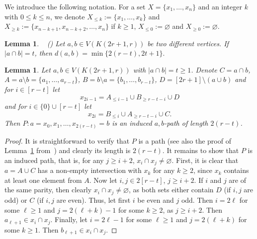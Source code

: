 \documentclass[a4paper,11pt]{article}
\newtheorem{lemma}[theorem]{Lemma}
\renewcommand{\emptyset}{\varnothing}
\begin{document}
We introduce the following notation.
For a set $X=\{x_1,\ldots , x_n\}$ and an integer $k$ with $0\leq k\leq n$, we denote $X_{\leq k}:=\{x_1,\ldots ,x_k\}$ and $X_{\geq k}:=\{x_{n-k+1},x_{n-k+2},\ldots , x_n\}$ if $k\geq 1$, $X_{\leq 0}:=\emptyset$ and $X_{\geq 0}:=\emptyset$.


\begin{lemma}\label{l:ValenciaPabon}~\hskip -6pt {\rm (\cite{valencia2005diameter})}
    Let $a,b \in V(K(2r+1,r))$ be two different vertices. If $|a \cap b|=t$, then $d(a,b)=\min{\{2(r-t),2t+1}\}.$  
 \end{lemma}

\begin{lemma}\label{l:ValenciaPabon-1}
    Let $a,b \in V(K(2r+1,r))$ with $|a \cap b|=t \geq 1$. Denote $C=a\cap b$, $A=a \setminus b =\{a_1,\ldots,a_{r-t}\}$, $B=b \setminus a =\{b_1,\ldots,b_{r-t}\}$, $D=[2r+1]\setminus(a \cup b)$ and for $i \in [r-t]$ let $$x_{2i-1}= A_{\leq i-1} \cup B_{\geq r-t-i} \cup D$$ and for $i \in \{0\}\cup[r-t]$ let $$x_{2i}=B_{\leq i} \cup A_{\geq r-t-i} \cup C.$$ 
    Then $P:a=x_0,x_1,\ldots , x_{2(r-t)}=b$ is an induced $a,b$-path of length $2(r-t)$.
\end{lemma}
\begin{proof}
    It is straightforward to verify that $P$ is a path (see also the proof of Lemma~\ref{l:ValenciaPabon} from~\cite{valencia2005diameter}) and clearly its length is $2(r-t)$. It remains to show that $P$ is an induced path, that is, for any $j \geq i+2$, $x_i \cap x_j \neq \emptyset$. First, it is clear that $a=A \cup C$ has a non-empty intersection with $x_k$ for any $k \geq 2$, since $x_k$ contains at least one element from $A$. Now let $i,j \in 2[r-t]$, $j \geq i+2.$ If $i$ and $j$ are of the same parity, then clearly $x_i \cap x_j \neq \emptyset$, as both sets either contain $D$ (if $i,j$ are odd) or $C$ (if $i,j$ are even). Thus, let first $i$ be even and $j$ odd. Then $i=2\ell$ for some $\ell \geq 1$ and $j=2(\ell+k)-1$ for some $k\geq 2$, as $j\geq i+2$. Then $a_{\ell+1} \in x_i \cap x_j$. Finally, let $i=2\ell-1$ for some $\ell \geq 1$ and $j=2(\ell+k)$ for some $k \geq 1$. Then $b_{\ell+1} \in x_i \cap x_j$.  
\end{proof}
\end{document}
